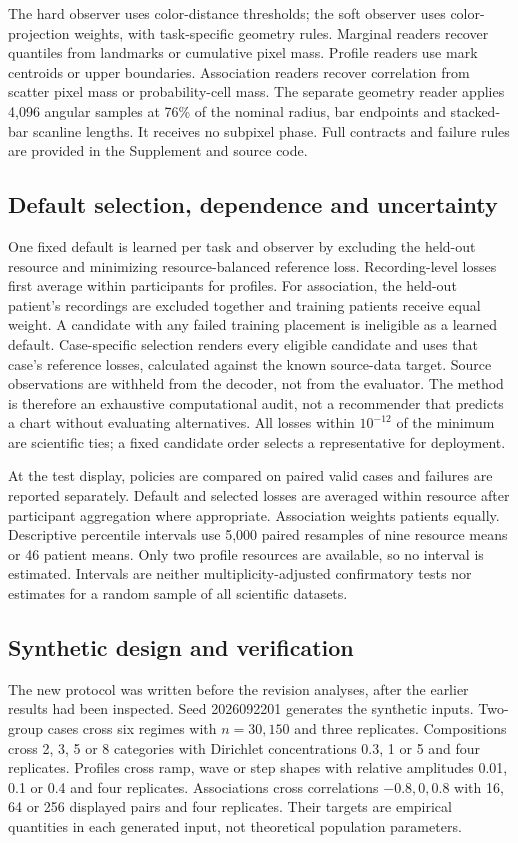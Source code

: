 \documentclass[11pt]{article}
\begin{document}
The hard observer uses color-distance thresholds; the soft observer uses color-projection weights, with task-specific geometry rules. Marginal readers recover quantiles from landmarks or cumulative pixel mass. Profile readers use mark centroids or upper boundaries. Association readers recover correlation from scatter pixel mass or probability-cell mass. The separate geometry reader applies 4,096 angular samples at 76\% of the nominal radius, bar endpoints and stacked-bar scanline lengths. It receives no subpixel phase. Full contracts and failure rules are provided in the Supplement and source code.

\subsection*{Default selection, dependence and uncertainty}
One fixed default is learned per task and observer by excluding the held-out resource and minimizing resource-balanced reference loss. Recording-level losses first average within participants for profiles. For association, the held-out patient's recordings are excluded together and training patients receive equal weight. A candidate with any failed training placement is ineligible as a learned default. Case-specific selection renders every eligible candidate and uses that case's reference losses, calculated against the known source-data target. Source observations are withheld from the decoder, not from the evaluator. The method is therefore an exhaustive computational audit, not a recommender that predicts a chart without evaluating alternatives. All losses within $10^{-12}$ of the minimum are scientific ties; a fixed candidate order selects a representative for deployment.

At the test display, policies are compared on paired valid cases and failures are reported separately. Default and selected losses are averaged within resource after participant aggregation where appropriate. Association weights patients equally. Descriptive percentile intervals use 5,000 paired resamples of nine resource means or 46 patient means. Only two profile resources are available, so no interval is estimated. Intervals are neither multiplicity-adjusted confirmatory tests nor estimates for a random sample of all scientific datasets.

\subsection*{Synthetic design and verification}
The new protocol was written before the revision analyses, after the earlier results had been inspected. Seed 2026092201 generates the synthetic inputs. Two-group cases cross six regimes with $n=30,150$ and three replicates. Compositions cross 2, 3, 5 or 8 categories with Dirichlet concentrations 0.3, 1 or 5 and four replicates. Profiles cross ramp, wave or step shapes with relative amplitudes 0.01, 0.1 or 0.4 and four replicates. Associations cross correlations $-0.8,0,0.8$ with 16, 64 or 256 displayed pairs and four replicates. Their targets are empirical quantities in each generated input, not theoretical population parameters.
\end{document}
